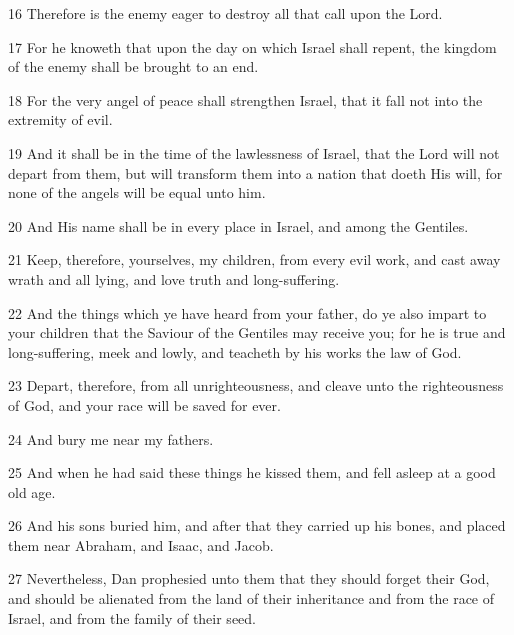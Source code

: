\par 16 Therefore is the enemy eager to destroy all that call upon the Lord.

\par 17 For he knoweth that upon the day on which Israel shall repent, the kingdom of the enemy shall be brought to an end.

\par 18 For the very angel of peace shall strengthen Israel, that it fall not into the extremity of evil.

\par 19 And it shall be in the time of the lawlessness of Israel, that the Lord will not depart from them, but will transform them into a nation that doeth His will, for none of the angels will be equal unto him.

\par 20 And His name shall be in every place in Israel, and among the Gentiles.

\par 21 Keep, therefore, yourselves, my children, from every evil work, and cast away wrath and all lying, and love truth and long-suffering.

\par 22 And the things which ye have heard from your father, do ye also impart to your children that the Saviour of the Gentiles may receive you; for he is true and long-suffering, meek and lowly, and teacheth by his works the law of God.

\par 23 Depart, therefore, from all unrighteousness, and cleave unto the righteousness of God, and your race will be saved for ever.

\par 24 And bury me near my fathers.

\par 25 And when he had said these things he kissed them, and fell asleep at a good old age.

\par 26 And his sons buried him, and after that they carried up his bones, and placed them near Abraham, and Isaac, and Jacob.

\par 27 Nevertheless, Dan prophesied unto them that they should forget their God, and should be alienated from the land of their inheritance and from the race of Israel, and from the family of their seed.



